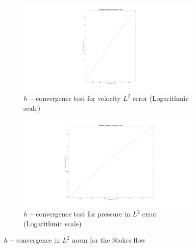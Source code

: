 \documentclass[a4paper,twoside,openright]{book}
\begin{document}
\begin{figure}
\begin{subfigure}{\textwidth}	
  \includegraphics[width=\linewidth]{l2_velocity_log_stokes.jpg}
  \caption{$h-$convergence test for velocity $L^2$ error (Logarithmic scale)}
  \label{fig:vel_stoke_conv_log}
\end{subfigure}
\begin{subfigure}{\textwidth}	
  \includegraphics[width=\linewidth]{l2_pressure_log_stokes.jpg}
  \caption{$h-$convergence test for pressure in $L^2$ error (Logarithmic scale)}
  \label{fig:pre_stoke_conv_log}
\end{subfigure}
\caption{$h-$convergence in $L^2$ norm for the Stokes flow}
\label{fig:l2_stokes}
\end{figure}
\end{document}
